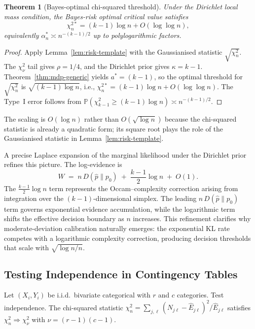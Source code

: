 \documentclass[11pt]{article}
\newcommand{\rhotail}{\rho}  %
\newcommand{\1}{\mathbf{1}}
\newcommand{\PP}{\mathbb{P}}
\theoremstyle{plain}
\newtheorem{theorem}{Theorem}[section]
\theoremstyle{definition}
\theoremstyle{remark}
\begin{document}
\begin{theorem}[Bayes-optimal chi-squared threshold]\label{thm:chi-squared-threshold}
Under the Dirichlet local mass condition, the Bayes-risk optimal critical value satisfies
\begin{equation}\label{eq:chi-squared-bayes-threshold}
\chi^{2*}_n
=
(k-1)\log n + O(\log\log n),
\end{equation}
equivalently $\alpha_n^*\asymp n^{-(k-1)/2}$ up to polylogarithmic factors.
\end{theorem}

\begin{proof}
Apply Lemma~\ref{lem:risk-template} with the Gaussianised statistic $\sqrt{\chi_n^2}$.
The $\chi^2_\nu$ tail gives $\rhotail=1/4$, and the Dirichlet prior gives $\kappa=k-1$.
Theorem~\ref{thm:mdp-generic} yields $a^*=(k-1)$, so the optimal threshold for $\sqrt{\chi_n^2}$ is $\sqrt{(k-1)\log n}$, i.e., $\chi_n^{2*}=(k-1)\log n + O(\log\log n)$.
The Type~I error follows from $\PP(\chi^2_{k-1}\ge (k-1)\log n)\asymp n^{-(k-1)/2}$.
\end{proof}

The scaling is $O(\log n)$ rather than $O(\sqrt{\log n})$ because the chi-squared statistic is already a quadratic form; its square root plays the role of the Gaussianised statistic in Lemma~\ref{lem:risk-template}.

A precise Laplace expansion of the marginal likelihood under the Dirichlet prior refines this picture.  The log-evidence is
\begin{equation}\label{eq:logN-refinement}
W \;=\; n\,D(\hat{p}\|p_0) \;+\; \frac{k-1}{2}\log n \;+\; O(1).
\end{equation}
The $\tfrac{k-1}{2}\log n$ term represents the Occam--complexity correction arising from integration over the $(k{-}1)$-dimensional simplex.
The leading $n\,D(\hat{p}\|p_0)$ term governs exponential evidence accumulation, while the logarithmic term shifts the effective decision boundary as $n$ increases.
This refinement clarifies why moderate-deviation calibration naturally emerges: the exponential KL rate competes with a logarithmic complexity correction, producing decision thresholds that scale with $\sqrt{\log n/n}$.


\subsection{Testing Independence in Contingency Tables}\label{subsec:contingency}

Let $(X_i,Y_i)$ be i.i.d.\ bivariate categorical with $r$ and $c$ categories. Test independence.
The chi-squared statistic
$\chi_n^2 = \sum_{j,\ell} (N_{j\ell}-\hat E_{j\ell})^2/\hat E_{j\ell}$
satisfies $\chi_n^2\Rightarrow \chi^2_{\nu}$ with $\nu=(r-1)(c-1)$.
\end{document}
